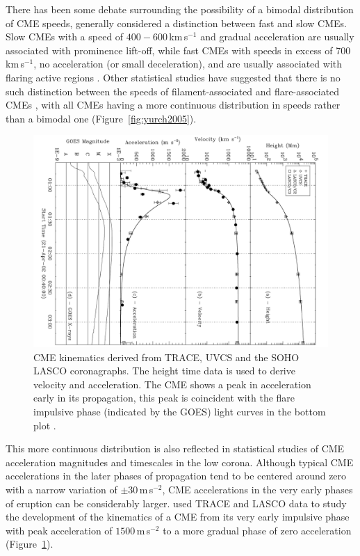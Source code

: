 There has been some debate surrounding the possibility of a bimodal distribution of CME speeds, generally considered a distinction between fast and slow CMEs. Slow CMEs with a speed of $400-600$\,km\,s$^{-1}$ and gradual acceleration are usually associated with prominence lift-off, while fast CMEs with speeds in excess of 700\,km\,s$^{-1}$, no acceleration (or small deceleration), and are usually associated with flaring active regions \citep{shee1999, gopal2004, moon2000}. Other statistical studies have suggested that there is no such distinction between the speeds of filament-associated and flare-associated CMEs \citep{vrsna2005, yurch2005}, with all CMEs having a more continuous distribution in speeds rather than a bimodal one (Figure~\ref{fig:yurch2005}). 

\begin{figure}[t!]
\begin{center}
\includegraphics[scale=0.35, angle=90, trim=1cm 0cm 2cm 2cm]{images/gall_kins2003}
\caption[CME height, speed, and acceleration as function of time]{CME kinematics derived from TRACE, UVCS and the SOHO LASCO coronagraphs. The height time data is used to derive velocity and acceleration. The CME shows a peak in acceleration early in its propagation, this peak is coincident with the flare impulsive phase (indicated by the GOES) light curves in the bottom plot \citep{gallagher03}.}
\label{fig:gall2003}
\end{center}
\end{figure}

This more continuous distribution is also reflected in statistical studies of CME acceleration magnitudes and timescales in the low corona. Although typical CME accelerations in the later phases of propagation tend to be centered around zero with a narrow variation of $\pm30$\,m\,s$^{-2}$, CME accelerations in the very early phases of eruption can be considerably larger. \citet{gallagher03} used TRACE and LASCO data to study the development of the kinematics of a CME from its very early impulsive phase with peak acceleration of $1500$\,m\,s$^{-2}$ to a more gradual phase of zero acceleration (Figure~\ref{fig:gall2003}). 


